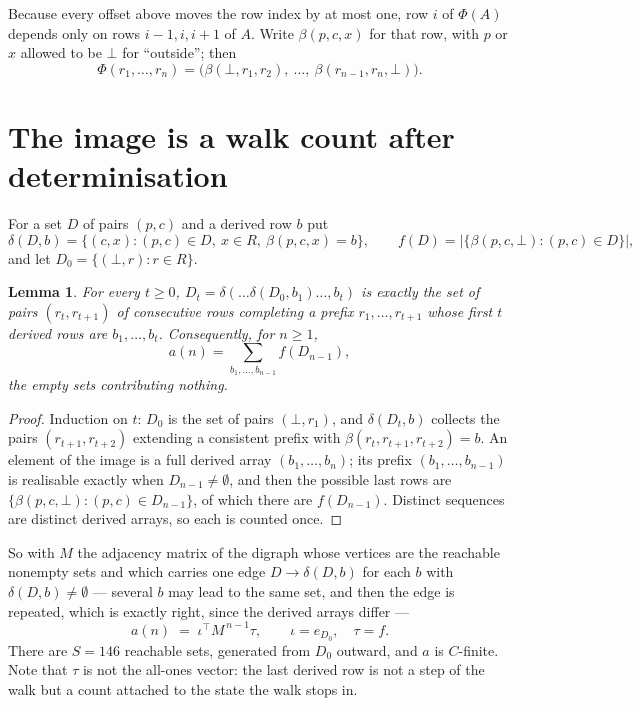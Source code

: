 \documentclass[11pt,a4paper]{article}
\theoremstyle{plain}
\newtheorem{lemma}[theorem]{Lemma}
\theoremstyle{definition}
\begin{document}
Because every offset above moves the row index by at most one, row $i$ of
$\Phi(A)$ depends only on rows $i-1,i,i+1$ of $A$. Write $\beta(p,c,x)$ for that row, with $p$
or $x$ allowed to be $\bot$ for ``outside''; then
\[
\Phi(r_1,\dots,r_n)=\bigl(\beta(\bot,r_1,r_2),\ \dots,\ \beta(r_{n-1},r_n,\bot)\bigr).
\]

\section{The image is a walk count after determinisation}

For a set $D$ of pairs $(p,c)$ and a derived row $b$ put
\[
\delta(D,b)=\{(c,x):(p,c)\in D,\ x\in R,\ \beta(p,c,x)=b\},\qquad
f(D)=\bigl|\{\beta(p,c,\bot):(p,c)\in D\}\bigr| ,
\]
and let $D_0=\{(\bot,r):r\in R\}$.

\begin{lemma}\label{lem:det}
For every $t\ge0$, $D_t=\delta(\dots\delta(D_0,b_1)\dots,b_t)$ is exactly the set of pairs
$(r_t,r_{t+1})$ of consecutive rows completing a prefix $r_1,\dots,r_{t+1}$ whose first $t$
derived rows are $b_1,\dots,b_t$. Consequently, for $n\ge1$,
\[
a(n)=\sum_{b_1,\dots,b_{n-1}}f(D_{n-1}),
\]
the empty sets contributing nothing.
\end{lemma}

\begin{proof}
Induction on $t$: $D_0$ is the set of pairs $(\bot,r_1)$, and $\delta(D_t,b)$ collects the
pairs $(r_{t+1},r_{t+2})$ extending a consistent prefix with
$\beta(r_t,r_{t+1},r_{t+2})=b$. An element of the image is a full derived array
$(b_1,\dots,b_n)$; its prefix $(b_1,\dots,b_{n-1})$ is realisable exactly when
$D_{n-1}\neq\emptyset$, and then the possible last rows are
$\{\beta(p,c,\bot):(p,c)\in D_{n-1}\}$, of which there are $f(D_{n-1})$. Distinct sequences
are distinct derived arrays, so each is counted once.
\end{proof}

So with $M$ the adjacency matrix of the digraph whose vertices are the reachable nonempty sets
and which carries one edge $D\to\delta(D,b)$ for each $b$ with $\delta(D,b)\neq\emptyset$ ---
several $b$ may lead to the same set, and then the edge is repeated, which is exactly right,
since the derived arrays differ ---
\[
a(n)\;=\;\iota^{\!\top}M^{\,n-1}\tau,\qquad \iota=e_{D_0},\quad \tau=f .
\]
There are $S=146$ reachable sets, generated from $D_0$ outward, and $a$ is $C$-finite.
Note that $\tau$ is not the all-ones vector: the last derived row is not a
step of the walk but a count attached to the state the walk stops in.
\end{document}
